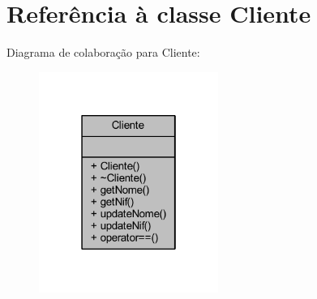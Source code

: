 \hypertarget{class_cliente}{}\section{Referência à classe Cliente}
\label{class_cliente}


Diagrama de colaboração para Cliente\+:
\nopagebreak
\begin{figure}[H]
\begin{center}
\leavevmode
\includegraphics[width=166pt]{class_cliente__coll__graph}
\end{center}
\end{figure}
